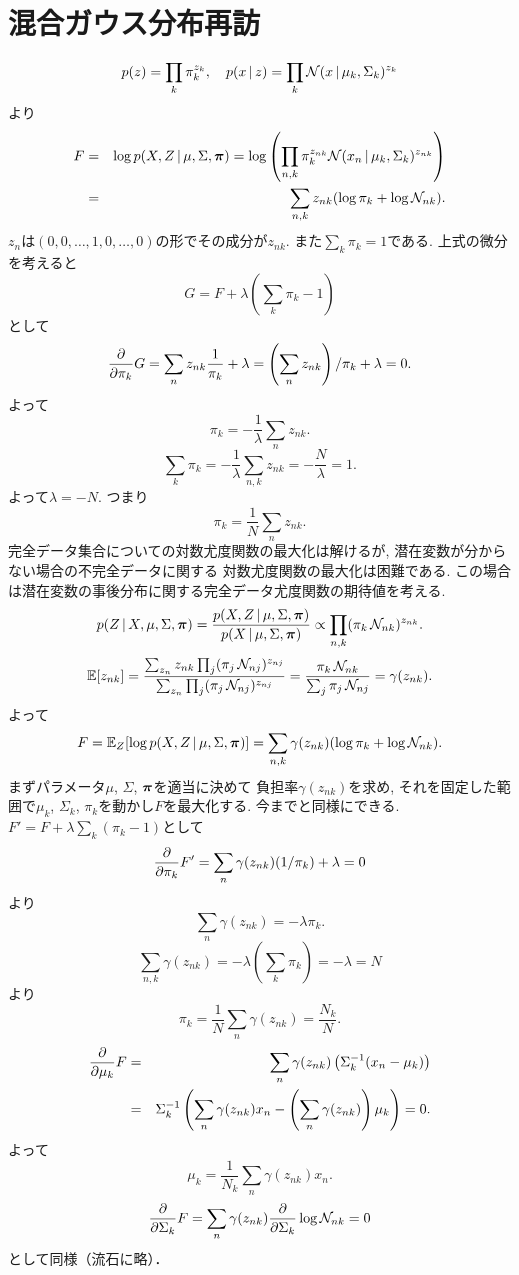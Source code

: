 \section{混合ガウス分布再訪}
$$
p(z)=\prod_k \pi_k^{z_{k}}, \quad p(x\,|\,z)=\prod_k {\cal N}(x\,|\,\mu_k,\Sigma_k)^{z_k}
$$
より
\begin{eqnarray*}
F
 &=& \log p(X,Z\,|\,\mu,\Sigma,\bm{\pi})
 = \log \left(\prod_{n,k} \pi_k^{z_{nk}}{\cal N}(x_n\,|\,\mu_k,\Sigma_k)^{z_{nk}}\right)\\
 &=& \sum_{n,k} z_{nk}(\log \pi_k + \log {\cal N}_{nk}).
\end{eqnarray*}
$z_n$は$(0, 0,\ldots, 1, 0, \ldots, 0)$の形でその成分が$z_{nk}$.
また$\sum_k \pi_k=1$である.
上式の微分を考えると
$$
G=F+\lambda\left(\sum_k \pi_k-1\right)
$$
として
$$
\frac{\partial}{\partial \pi_k}G=\sum_n z_{nk}\frac{1}{\pi_k}+\lambda=\left(\sum_n z_{nk}\right)/\pi_k + \lambda=0.
$$
よって
$$
\pi_k = -\frac{1}{\lambda}\sum_n z_{nk}.
$$
$$
\sum_k \pi_k=-\frac{1}{\lambda}\sum_{n,k}z_{nk}=-\frac{N}{\lambda}=1.
$$
よって$\lambda=-N$.
つまり
$$
\pi_k=\frac{1}{N}\sum_n z_{nk}.
$$
完全データ集合についての対数尤度関数の最大化は解けるが, 
潜在変数が分からない場合の不完全データに関する
対数尤度関数の最大化は困難である.
この場合は潜在変数の事後分布に関する完全データ尤度関数の期待値を考える.
$$
p(Z\,|\,X,\mu,\Sigma,\bm{\pi})
 = \frac{p(X,Z\,|\,\mu,\Sigma,\bm{\pi})}{p(X\,|\,\mu,\Sigma,\bm{\pi})}
 \propto \prod_{n,k} (\pi_k\,{\cal N}_{nk})^{z_{nk}}.
$$
$$
\mathbb{E}[z_{nk}]=\frac{\sum_{z_n} z_{nk} \prod_j (\pi_j\,{\cal N}_{nj})^{z_{nj}}}
               {\sum_{z_n} \prod_j(\pi_j\,{\cal N}_{nj})^{z_{nj}}}
         =\frac{\pi_k\,{\cal N}_{nk}}{\sum_j \pi_j\,{\cal N}_{nj}} = \gamma(z_{nk}).
$$
よって
$$
F=\mathbb{E}_Z[\log p(X,Z\,|\,\mu,\Sigma,\bm{\pi})]=\sum_{n,k}\gamma(z_{nk})(\log \pi_k + \log {\cal N}_{nk}).
$$
まずパラメータ$\mu$, $\Sigma$, $\bm{\pi}$を適当に決めて
負担率$\gamma(z_{nk})$を求め,
それを固定した範囲で$\mu_k$, $\Sigma_k$, $\pi_k$を動かし$F$を最大化する.
今までと同様にできる.
$F'=F+\lambda\sum_k\left(\pi_k-1\right)$として
$$
\frac{\partial}{\partial \pi_k}F'=\sum_n \gamma(z_{nk})(1/\pi_k)+\lambda=0
$$
より
$$
\sum_n \gamma(z_{nk})=-\lambda \pi_k.
$$
$$
\sum_{n,k}\gamma(z_{nk})=-\lambda\left(\sum_k \pi_k\right)=-\lambda=N
$$
より
$$
\pi_k=\frac{1}{N}\sum_n \gamma(z_{nk})=\frac{N_k}{N}.
$$
\begin{eqnarray*}
\frac{\partial}{\partial \mu_k}F
&=&\sum_n\gamma(z_{nk})\left(\Sigma_k^{-1}(x_n-\mu_k)\right)
\\
&=&\Sigma_k^{-1}\left(\sum_n \gamma(z_{nk})x_n-\left(\sum_n \gamma(z_{nk})\right)\mu_k\right)=0.
\end{eqnarray*}
よって
$$
\mu_k=\frac{1}{N_k}\sum_n \gamma(z_{nk})x_n.
$$
$$
\frac{\partial}{\partial \Sigma_k}F=\sum_n \gamma(z_{nk}) \frac{\partial}{\partial \Sigma_k}\log {\cal N}_{nk}=0
$$
として同様（流石に略）．

